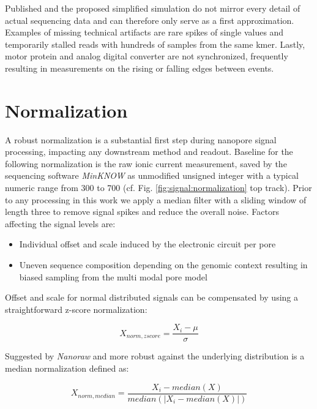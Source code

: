 Published and the proposed simplified simulation do not mirror every detail of actual sequencing data and can therefore only serve as a first approximation. Examples of missing technical artifacts are rare spikes of single values and temporarily stalled reads with hundreds of samples from the same kmer. Lastly, motor protein and analog digital converter are not synchronized, frequently resulting in measurements on the rising or falling edges between events.




\section{Normalization}
\label{sec:signal:normalization}

A robust normalization is a substantial first step during nanopore signal processing, impacting any downstream method and readout. Baseline for the following normalization is the raw ionic current measurement, saved by the sequencing software \textit{MinKNOW} as unmodified unsigned integer with a typical numeric range from 300 to 700 (cf. Fig. \ref{fig:signal:normalization} top track). Prior to any processing in this work we apply a median filter with a sliding window of length three to remove signal spikes and reduce the overall noise. Factors affecting the signal levels are:

\begin{itemize}
	\item Individual offset and scale induced by the electronic circuit per pore
	\item Uneven sequence composition depending on the genomic context resulting in biased sampling from the multi modal pore model
\end{itemize}

Offset and scale for normal distributed signals can be compensated by using a straightforward z-score normalization:

\begin{equation}
	X_{norm,zscore} = \frac{X_{i} - \mu}{\sigma}
\end{equation}

Suggested by \textit{Nanoraw} \cite{Stoiber2017} and more robust against the underlying distribution is a median normalization defined as:

\begin{equation}
	X_{norm,median} = \frac{X_{i} - median(X)}{median(\left|X_{i}-median(X)\right|)}
\end{equation}

